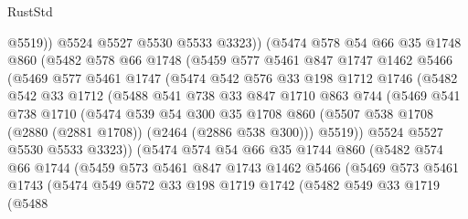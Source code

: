 \begin{lexlean}{RustStd}
\begin{coremodule}
                @5519))
            @5524
            @5527
            @5530
            @5533
            @3323))
        (@5474
          @578
          @54
          @66
          @35
          @1748
          @860
          (@5482
            @578
            @66
            @1748
            (@5459
              @577
              @5461
              @847
              @1747
              @1462
              @5466
              (@5469
                @577
                @5461
                @1747
                (@5474
                  @542
                  @576
                  @33
                  @198
                  @1712
                  @1746
                  (@5482
                    @542
                    @33
                    @1712
                    (@5488
                      @541
                      @738
                      @33
                      @847
                      @1710
                      @863
                      @744
                      (@5469
                        @541
                        @738
                        @1710
                        (@5474
                          @539
                          @54
                          @300
                          @35
                          @1708
                          @860
                          (@5507 @538 @1708 (@2880 (@2881 @1708)) (@2464 (@2886 @538 @300)))
                          @5519))
                      @5524
                      @5527
                      @5530
                      @5533
                      @3323))
                  (@5474
                    @574
                    @54
                    @66
                    @35
                    @1744
                    @860
                    (@5482
                      @574
                      @66
                      @1744
                      (@5459
                        @573
                        @5461
                        @847
                        @1743
                        @1462
                        @5466
                        (@5469
                          @573
                          @5461
                          @1743
                          (@5474
                            @549
                            @572
                            @33
                            @198
                            @1719
                            @1742
                            (@5482
                              @549
                              @33
                              @1719
                              (@5488

\end{coremodule}
\end{lexlean}
